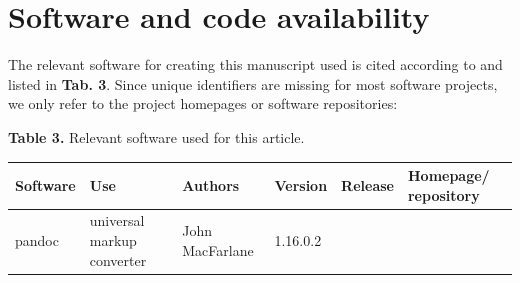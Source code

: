 \documentclass[10pt,fleqn]{wlpeerj}
\begin{document}
\section{Software
and
code
availability}\label{software-and-code-availability}

The
relevant
software
for
creating
this
manuscript
used
is
cited
according
to
\citep{smith_software_2016}
and
listed
in
\textbf{Tab.
3}.
Since
unique
identifiers
are
missing
for
most
software
projects,
we
only
refer
to
the
project
homepages
or
software
repositories:

\textbf{Table
3.}
Relevant
software
used
for
this
article.

\begin{longtable}[]{@{}llllll@{}}
\toprule
\begin{minipage}[b]{0.08\columnwidth}\raggedright\strut
\textbf{Software}
\strut\end{minipage}
&
\begin{minipage}[b]{0.20\columnwidth}\raggedright\strut
\textbf{Use}
\strut\end{minipage}
&
\begin{minipage}[b]{0.17\columnwidth}\raggedright\strut
\textbf{Authors}
\strut\end{minipage}
&
\begin{minipage}[b]{0.06\columnwidth}\raggedright\strut
\textbf{Version}
\strut\end{minipage}
&
\begin{minipage}[b]{0.06\columnwidth}\raggedright\strut
\textbf{Release}
\strut\end{minipage}
&
\begin{minipage}[b]{0.25\columnwidth}\raggedright\strut
\textbf{Homepage/
repository}
\strut\end{minipage}\tabularnewline
\midrule
\endhead
\begin{minipage}[t]{0.08\columnwidth}\raggedright\strut
pandoc
\strut\end{minipage}
&
\begin{minipage}[t]{0.20\columnwidth}\raggedright\strut
universal
markup
converter
\strut\end{minipage}
&
\begin{minipage}[t]{0.17\columnwidth}\raggedright\strut
John
MacFarlane
\strut\end{minipage}
&
\begin{minipage}[t]{0.06\columnwidth}\raggedright\strut
1.16.0.2
\strut\end{minipage}
&
\begin{minipage}[t]{0.06\columnwidth}\raggedright\strut

\end{minipage}
\end{longtable}
\end{document}
